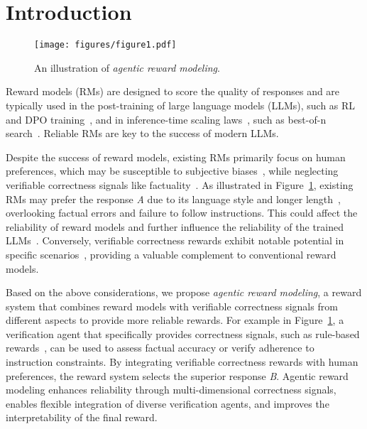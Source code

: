 \section{Introduction}

\begin{figure}[t]
    \centering
    \texttt{[image: figures/figure1.pdf]} %
    \caption{An illustration of \textit{agentic reward modeling}.
    }
    \label{fig:fig1}
\end{figure}

Reward models (RMs) are designed to score the quality of responses and are typically used in the post-training of large language models (LLMs), such as RL~\citep{ouyang2022training} and DPO training~\citep{rafailov2024direct}, and in inference-time scaling laws~\citep{wu2024inference,snell2024scaling}, such as best-of-n search~\citep{brown2024large}. Reliable RMs are key to the success of modern LLMs.


Despite the success of reward models, existing RMs primarily focus on human preferences, which may be susceptible to subjective biases~\citep{saito2023verbosity,singhal2023long}, while neglecting verifiable correctness signals like factuality~\citep{liu2024rm, tan2024judgebench}. As illustrated in Figure~\ref{fig:fig1}, existing RMs may prefer the response \textit{A} due to its language style and longer length~\citep{singhal2023long}, overlooking factual errors and failure to follow instructions. This could affect the reliability of reward models and further influence the reliability of the trained LLMs~\citep{singhal2023long,chen2024odin}.
Conversely, verifiable correctness rewards exhibit notable potential in specific scenarios~\citep{guo2025deepseek}, providing a valuable complement to conventional reward models.



Based on the above considerations, we propose \textit{agentic reward modeling}, a reward system that combines reward models with verifiable correctness signals from different aspects to provide more reliable rewards. For example in Figure~\ref{fig:fig1}, a verification agent that specifically provides correctness signals, such as rule-based rewards~\citep{mu2024rule}, can be used to assess factual accuracy or verify adherence to instruction constraints. By integrating verifiable correctness rewards with human preferences, the reward system selects the superior response \textit{B}.
Agentic reward modeling enhances reliability through multi-dimensional correctness signals, enables flexible integration of diverse verification agents, and improves the interpretability of the final reward.


